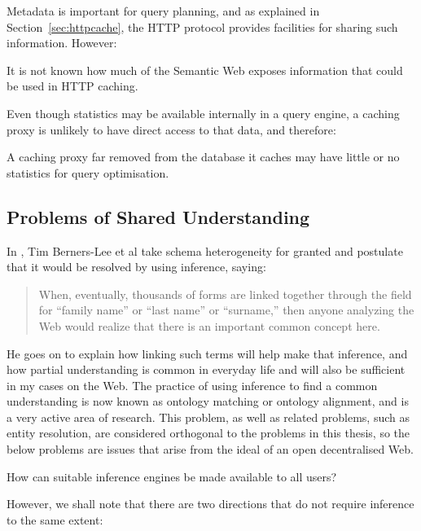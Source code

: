 Metadata is important for query planning, and as explained in
Section~\ref{sec:httpcache}, the HTTP protocol provides facilities for
sharing such information. However:
\begin{problem}\label{prob:sanity}
It is not known how much of the Semantic Web exposes information that
could be used in HTTP caching.
\end{problem}


Even though statistics may be available internally in a query engine,
a caching proxy is unlikely to have direct access to that data, and therefore:
\begin{problem}\label{prob:nostats}
A caching proxy far removed from the database it caches may have
little or no statistics for query optimisation.
\end{problem}


\subsection{Problems of Shared Understanding}\label{sec:semproblems}

In \cite{berners2000weaving}, Tim Berners-Lee et al take schema
heterogeneity for granted and postulate that it would be resolved by using
inference, saying:

\begin{quote}
When, eventually, thousands of forms are linked together through the
field for ``family name'' or ``last name'' or ``surname,'' then anyone
analyzing the Web would realize that there is an important common
concept here.
\end{quote}

He goes on to explain how linking such terms will help make
that inference, and how partial understanding is common in everyday
life and will also be sufficient in my cases on the Web. The practice
of using inference to find a common understanding is now known as
ontology matching or ontology alignment, and is a very active area of
research. This problem, as well as related problems, such as entity
resolution, are considered orthogonal to the problems in this thesis,
so the below problems are issues that arise from the ideal of an open
decentralised Web.

\begin{problem}\label{prob:infgivecode}
How can suitable inference engines be made available to all users?
\end{problem}


However, we shall note that there are two directions that do not
require inference to the same extent: 

